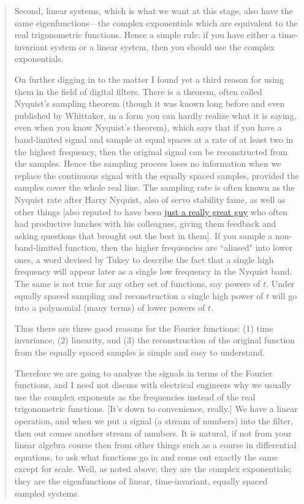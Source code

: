 \documentclass[10pt]{article}
\begin{document}
{\begin{quotation}
Second, linear systems, which is what we want at this stage, also have the same eigenfunctions—the complex exponentials which are equivalent to the real trigonometric functions. Hence a simple rule: if you have either a time-invariant system or a linear system, then you should use the complex exponentials.

On further digging in to the matter I found yet a third reason for using them in the field of digital filters. There is a theorem, often called Nyquist's sampling theorem (though it was known long before and even published by Whittaker, in a form you can hardly realize what it is saying, even when you know Nyquist's theorem), which says that if you have a band-limited signal and sample at equal spaces at a rate of at least two in the highest frequency, then the original signal can be reconstructed from the samples. Hence the sampling process loses no information when we replace the continuous signal with the equally spaced samples, provided the samples cover the whole real line. The sampling rate is often known as the Nyquist rate after Harry Nyquist, also of servo stability fame, as well as other things [also reputed to have been \href{https://deanebarker.net/tech/linkedin/harry-nyquist-again/}{just a really great guy} who often had productive lunches with his colleagues, giving them feedback and asking questions that brought out the best in them]. If you sample a non-band-limited function, then the higher frequencies are ``aliased" into lower ones, a word devised by Tukey to describe the fact that a single high frequency will appear later as a single low frequency in the Nyquist band. The same is not true for any other set of functions, say powers of $t$. Under equally spaced sampling and reconstruction a single high power of $t$ will go into a polynomial (many terms) of lower powers of $t$.

Thus there are three good reasons for the Fourier functions: (1) time invariance, (2) linearity, and (3) the reconstruction of the original function from the equally spaced samples is simple and easy to understand.

Therefore we are going to analyze the signals in terms of the Fourier functions, and I need not discuss with electrical engineers why we usually use the complex exponents as the frequencies instead of the real trigonometric functions. [It's down to convenience, really.] We have a linear operation, and when we put a signal (a stream of numbers) into the filter, then out comes another stream of numbers. It is natural, if not from your linear algebra course then from other things such as a course in differential equations, to ask what functions go in and come out exactly the same except for scale. Well, as noted above, they are the complex exponentials; they are the eigenfunctions of linear, time-invariant, equally spaced sampled systems.


\end{quotation}}
\end{document}
